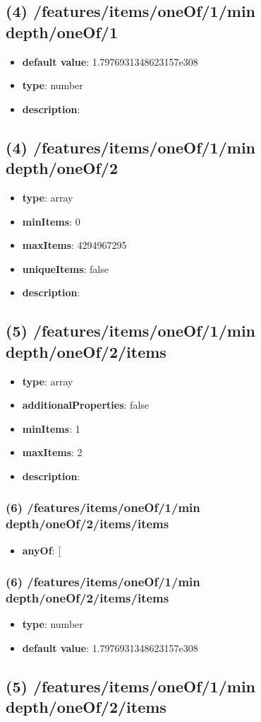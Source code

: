 \subsection{(4) /features/items/oneOf/1/min depth/oneOf/1}
\begin{itemize}[leftmargin=4em]\item {\bf default value}: 1.7976931348623157e308
\item {\bf type}: number
\item {\bf description}: 
\end{itemize}\subsection{(4) /features/items/oneOf/1/min depth/oneOf/2}
\begin{itemize}[leftmargin=4em]\item {\bf type}: array
\item {\bf minItems}: 0
\item {\bf maxItems}: 4294967295
\item {\bf uniqueItems}: false
\item {\bf description}: 
\end{itemize}\subsection{(5) /features/items/oneOf/1/min depth/oneOf/2/items}
\begin{itemize}[leftmargin=5em]\item {\bf type}: array
\item {\bf additionalProperties}: false
\item {\bf minItems}: 1
\item {\bf maxItems}: 2
\item {\bf description}: 
\end{itemize}\subsubsection{(6) /features/items/oneOf/1/min depth/oneOf/2/items/items}
\begin{itemize}[leftmargin=6em]\item {\bf anyOf}: [\end{itemize}\subsubsection{(6) /features/items/oneOf/1/min depth/oneOf/2/items/items}
\begin{itemize}[leftmargin=6em]\item {\bf type}: number\item {\bf default value}: 1.7976931348623157e308
\end{itemize}\subsection{(5) /features/items/oneOf/1/min depth/oneOf/2/items}

